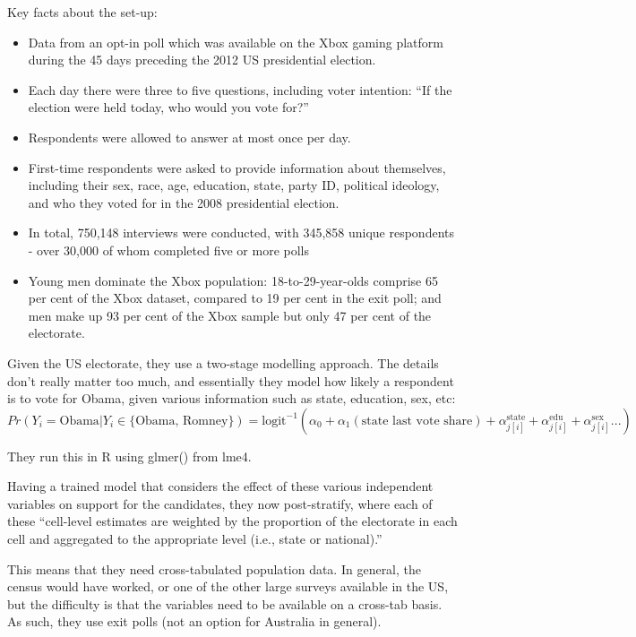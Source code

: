 \documentclass[
]{book}
\providecommand{\tightlist}{%
  \setlength{\itemsep}{0pt}\setlength{\parskip}{0pt}}
\begin{document}
Key facts about the set-up:

\begin{itemize}
\tightlist
\item
  Data from an opt-in poll which was available on the Xbox gaming platform during the 45 days preceding the 2012 US presidential election.
\item
  Each day there were three to five questions, including voter intention: ``If the election were held today, who would you vote for?''
\item
  Respondents were allowed to answer at most once per day.
\item
  First-time respondents were asked to provide information about themselves, including their sex, race, age, education, state, party ID, political ideology, and who they voted for in the 2008 presidential election.
\item
  In total, 750,148 interviews were conducted, with 345,858 unique respondents - over 30,000 of whom completed five or more polls
\item
  Young men dominate the Xbox population: 18-to-29-year-olds comprise 65 per cent of the Xbox dataset, compared to 19 per cent in the exit poll; and men make up 93 per cent of the Xbox sample but only 47 per cent of the electorate.
\end{itemize}

Given the US electorate, they use a two-stage modelling approach. The details don't really matter too much, and essentially they model how likely a respondent is to vote for Obama, given various information such as state, education, sex, etc:
\[
Pr\left(Y_i = \mbox{Obama} | Y_i\in\{\mbox{Obama, Romney}\}\right) = \mbox{logit}^{-1}(\alpha_0 + \alpha_1(\mbox{state last vote share}) 
+ \alpha_{j[i]}^{\mbox{state}} + \alpha_{j[i]}^{\mbox{edu}} + \alpha_{j[i]}^{\mbox{sex}}...
)
\]

They run this in R using glmer() from lme4.

Having a trained model that considers the effect of these various independent variables on support for the candidates, they now post-stratify, where each of these ``cell-level estimates are weighted by the proportion of the electorate in each cell and aggregated to the appropriate level (i.e., state or national).''

This means that they need cross-tabulated population data. In general, the census would have worked, or one of the other large surveys available in the US, but the difficulty is that the variables need to be available on a cross-tab basis. As such, they use exit polls (not an option for Australia in general).
\end{document}
